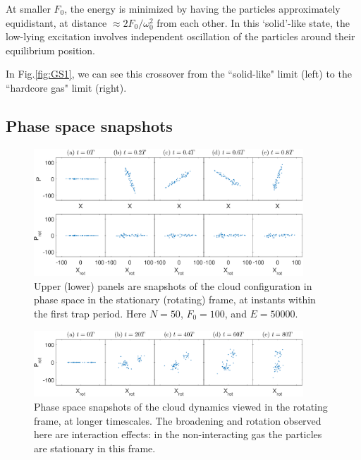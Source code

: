 \documentclass[aps,preprintnumbers,onecolumn,amsmath,amssymb,floatfix,pra]{revtex4-1}
\begin{document}
At smaller $F_0$, the energy is minimized by having the particles approximately equidistant, at
distance $\approx 2F_0/\omega_0^2$ from each other.  In this `solid'-like state, the low-lying
excitation involves independent oscillation of the particles around their equilibrium position.  

In Fig.\ref{fig:GS1}, we can see this crossover from the ``solid-like" limit (left) to the
``hardcore gas" limit (right).


\subsection{Phase space snapshots}


\begin{figure}[h]
\includegraphics[width=0.9\textwidth]{ZhiyuPictures/stationary_and_rotating_frame_t=1-5_5T.eps}
%
\caption{Upper (lower) panels are snapshots of the cloud configuration in phase space in the
  stationary (rotating) frame, at instants within the first trap period.  Here $N=50$, $F_0=100$,
  and $E=50000$.  }
\label{fig:Breathingfrequency2_0}
\end{figure}


\begin{figure}
\includegraphics[width=0.9\textwidth]{ZhiyuPictures/rotating_frame_t=0-80T.eps}  
\caption{Phase space snapshots of the cloud dynamics viewed in the rotating frame, at longer
  timescales.  The broadening and rotation observed here are interaction effects: in the
  non-interacting gas the particles are stationary in this frame.}
\label{fig:Breathingfrequency2_1}
\end{figure}
\end{document}
